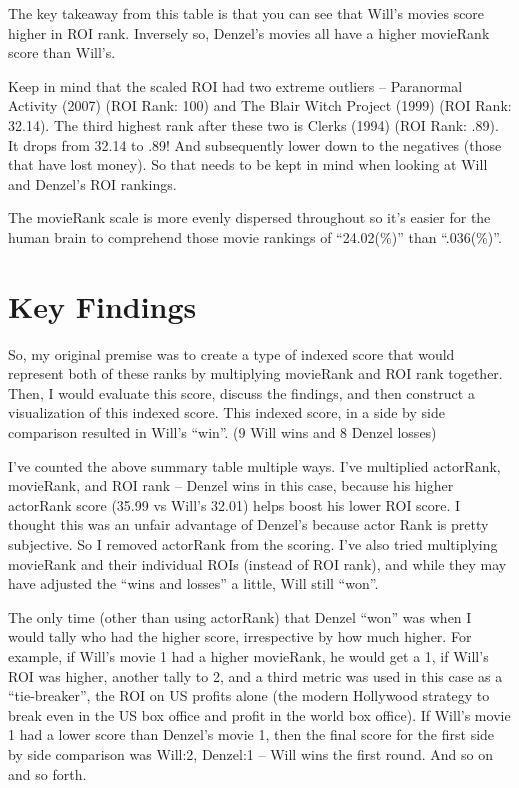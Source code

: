 \documentclass[]{article}
\begin{document}
The key takeaway from this table is that you can see that Will's movies
score higher in ROI rank. Inversely so, Denzel's movies all have a
higher movieRank score than Will's.

Keep in mind that the scaled ROI had two extreme outliers -- Paranormal
Activity (2007) (ROI Rank: 100) and The Blair Witch Project (1999) (ROI
Rank: 32.14). The third highest rank after these two is Clerks (1994)
(ROI Rank: .89). It drops from 32.14 to .89! And subsequently lower down
to the negatives (those that have lost money). So that needs to be kept
in mind when looking at Will and Denzel's ROI rankings.

The movieRank scale is more evenly dispersed throughout so it's easier
for the human brain to comprehend those movie rankings of
\enquote{24.02(\%)} than \enquote{.036(\%)}.

\section{Key Findings}
\label{sec:findings}

So, my original premise was to create a type of indexed score that would
represent both of these ranks by multiplying movieRank and ROI rank
together. Then, I would evaluate this score, discuss the findings, and
then construct a visualization of this indexed score. This indexed
score, in a side by side comparison resulted in Will's \enquote{win}. (9
Will wins and 8 Denzel losses)

I've counted the above summary table multiple ways. I've multiplied
actorRank, movieRank, and ROI rank -- Denzel wins in this case, because
his higher actorRank score (35.99 vs Will's 32.01) helps boost his lower
ROI score. I thought this was an unfair advantage of Denzel's because
actor Rank is pretty subjective. So I removed actorRank from the
scoring. I've also tried multiplying movieRank and their individual ROIs
(instead of ROI rank), and while they may have adjusted the
\enquote{wins and losses} a little, Will still \enquote{won}.

The only time (other than using actorRank) that Denzel \enquote{won} was
when I would tally who had the higher score, irrespective by how much
higher. For example, if Will's movie 1 had a higher movieRank, he would
get a 1, if Will's ROI was higher, another tally to 2, and a third
metric was used in this case as a \enquote{tie-breaker}, the ROI on US
profits alone (the modern Hollywood strategy to break even in the US box
office and profit in the world box office). If Will's movie 1 had a
lower score than Denzel's movie 1, then the final score for the first
side by side comparison was Will:2, Denzel:1 -- Will wins the first
round. And so on and so forth.
\end{document}
